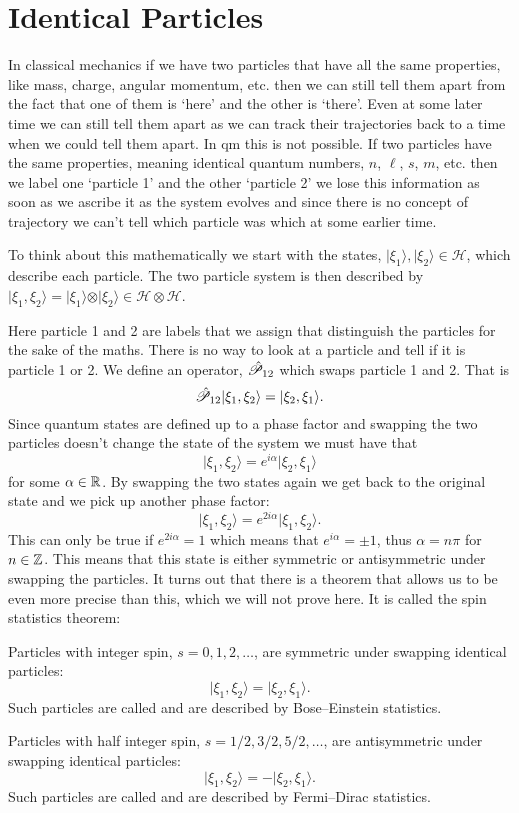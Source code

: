 \documentclass[a4paper]{article}
\renewcommand{\ket}[1]{\vert {#1} \rangle}
\newcommand{\hilbert}{\mathcal{H}}
\newcommand{\parity}{\mathscr{P}}
\newcommand{\tensorProd}{\otimes}
\theoremstyle{definition}
\begin{document}
    \section{Identical Particles}
    In classical mechanics if we have two particles that have all the same properties, like mass, charge, angular momentum, etc. then we can still tell them apart from the fact that one of them is `here' and the other is `there'.
    Even at some later time we can still tell them apart as we can track their trajectories back to a time when we could tell them apart.
    In \gls{qm} this is not possible.
    If two particles have the same properties, meaning identical quantum numbers, \(n\), \(\ell\), \(s\), \(m\), etc. then we label one `particle 1' and the other `particle 2' we lose this information as soon as we ascribe it as the system evolves and since there is no concept of trajectory we can't tell which particle was which at some earlier time.
    
    To think about this mathematically we start with the states, \(\ket{\xi_1}, \ket{\xi_2}\in\hilbert\), which describe each particle.
    The two particle system is then described by \(\ket{\xi_1, \xi_2} = \ket{\xi_1}\tensorProd\ket{\xi_2} \in\hilbert \tensorProd\hilbert\).
    
    Here particle 1 and 2 are labels that we assign that distinguish the particles for the sake of the maths.
    There is no way to look at a particle and tell if it is particle 1 or 2.
    We define an operator, \(\operator{\parity}_{12}\) which swaps particle 1 and 2.
    That is
    \[\operator{\parity}_{12}\ket{\xi_1, \xi_2} = \ket{\xi_2, \xi_1}.\]
    Since quantum states are defined up to a phase factor and swapping the two particles doesn't change the state of the system we must have that
    \[\ket{\xi_1, \xi_2} = e^{i\alpha}\ket{\xi_2, \xi_1}\]
    for some \(\alpha\in\mathbb{R}\).
    By swapping the two states again we get back to the original state and we pick up another phase factor:
    \[\ket{\xi_1, \xi_2} = e^{2i\alpha}\ket{\xi_1, \xi_2}.\]
    This can only be true if \(e^{2i\alpha} = 1\) which means that \(e^{i\alpha} = \pm 1\), thus \(\alpha = n\pi\) for \(n\in\mathbb{Z}\).
    This means that this state is either symmetric or antisymmetric under swapping the particles.
    It turns out that there is a theorem that allows us to be even more precise than this, which we will not prove here.
    It is called the spin statistics theorem:
    \begin{theorem}
        Particles with integer spin, \(s = 0, 1, 2, \dotsc\), are symmetric under swapping identical particles:
        \[\ket{\xi_1, \xi_2} = \ket{\xi_2, \xi_1}.\]
        Such particles are called  and are described by Bose--Einstein statistics.
        
        Particles with half integer spin, \(s = 1/2, 3/2, 5/2, \dotsc\), are antisymmetric under swapping identical particles:
        \[\ket{\xi_1, \xi_2} = - \ket{\xi_2, \xi_1}.\]
        Such particles are called  and are described by Fermi--Dirac statistics.
    \end{theorem}
\end{document}
